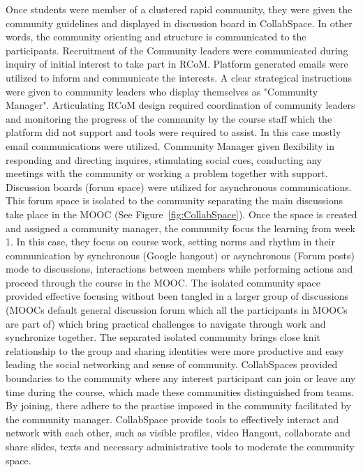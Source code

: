 \documentclass[format=acmsmall, review=false, screen=true]{acmart}
\begin{document}
Once students were member of a clustered rapid community, they were given the community guidelines and displayed in discussion board in CollabSpace. In other words, the community orienting and structure is communicated to the participants. Recruitment of the Community leaders were communicated during inquiry of initial interest to take part in RCoM. Platform generated emails were utilized to inform and communicate the interests. A clear strategical instructions were given to community leaders who display themselves as "Community Manager". Articulating RCoM design required coordination of community leaders and monitoring the progress of the community by the course staff which the platform did not support and tools were required to assist. In this case mostly email communications were utilized. Community Manager given flexibility in responding and directing inquires, stimulating social cues, conducting any meetings with the community or working a problem together with support. Discussion boards (forum space) were utilized for asynchronous communications. This forum space is isolated to the community separating the main discussions take place in the MOOC (See Figure~\ref{fig:CollabSpace}). Once the space is created and assigned a community manager, the community focus the learning from week 1. In this case, they focus on course work, setting norms and rhythm in their communication by synchronous (Google hangout) or asynchronous (Forum posts) mode to discussions, interactions between members while performing actions and proceed through the course in the MOOC. The isolated community space provided effective focusing without been tangled in a larger group of discussions (MOOCs default general discussion forum which all the participants in MOOCs are part of) which bring practical challenges to navigate through work and synchronize together. The separated isolated community brings close knit relationship to the group and sharing identities were more productive and easy leading the social networking and sense of community. CollabSpaces provided boundaries to the community where any interest participant can join or leave any time during the course, which made these communities distinguished from teams. By joining, there adhere to the practise imposed in the community facilitated by the community manager. CollabSpace provide tools to effectively interact and network with each other, such as visible profiles, video Hangout, collaborate and share slides, texts and necessary administrative tools to moderate the community space. 
\end{document}
